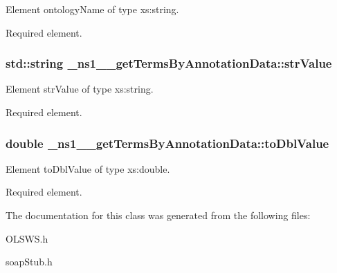 Element ontologyName of type xs:string. 

Required element. \hypertarget{class__ns1____getTermsByAnnotationData_aa431f2c0230ee32aad7be95da74c7efd}{
\subsubsection[{strValue}]{\setlength{\rightskip}{0pt plus 5cm}std::string {\bf \_\-ns1\_\-\_\-getTermsByAnnotationData::strValue}}}
\label{class__ns1____getTermsByAnnotationData_aa431f2c0230ee32aad7be95da74c7efd}


Element strValue of type xs:string. 

Required element. \hypertarget{class__ns1____getTermsByAnnotationData_a261ea73865928f6d1925fb43d07817e4}{
\subsubsection[{toDblValue}]{\setlength{\rightskip}{0pt plus 5cm}double {\bf \_\-ns1\_\-\_\-getTermsByAnnotationData::toDblValue}}}
\label{class__ns1____getTermsByAnnotationData_a261ea73865928f6d1925fb43d07817e4}


Element toDblValue of type xs:double. 

Required element. 

The documentation for this class was generated from the following files:\begin{DoxyCompactItemize}
\item 
OLSWS.h\item 
soapStub.h\end{DoxyCompactItemize}
